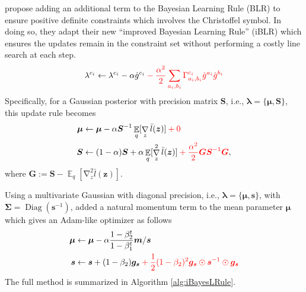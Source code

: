 \documentclass[a4paper, 11pt, oneside]{scrartcl}
\theoremstyle{break}
\DeclareMathOperator{\Diag}{Diag}
\DeclareMathOperator{\Expect}{\mathbb{E}}
\DeclareMathOperator{\grad}{\nabla}
\newcommand{\matr}[1]{\boldsymbol{#1}}
\numberwithin{equation}{section}
\begin{document}
				\parencite{LSK20} propose adding an additional term to the Bayesian Learning Rule (BLR) to ensure positive definite constraints which involves the Christoffel symbol. 
				In doing so, they adapt their new ``improved Bayesian Learning Rule'' (iBLR) which ensures the updates remain in the constraint set without performing a costly line search at each step.
				\begin{align*}
					\lambda^{c_i} \leftarrow \lambda^{c_i} - \alpha \hat{g}^{c_i} \color{red} - \frac{\alpha^2}{2} \sum_{a_i, b_i} \Gamma_{a_i, b_i}^{c_i} \hat{g}^{a_i} \hat{g}^{b_i} \color{black}
				\end{align*}
				Specifically, for a Gaussian posterior with precision matrix $\matr{S}$, i.e., $\matr{\lambda} = \{\matr{\mu}, \matr{S}\}$, this update rule becomes
				\begin{align*}
					\matr{\mu} &\leftarrow \matr{\mu} - \alpha \matr{S}^{-1} \Expect_q[\grad_z \bar{l}(\matr{z})] \color{red} + 0 \color{black}\\
					\matr{S} &\leftarrow (1 - \alpha) \matr{S} + \alpha \Expect_q[\grad_z^2 \bar{l}(\matr{z})] \color{red} + \frac{\alpha^2}{2} \matr{G} \matr{S}^{-1} \matr{G} \color{black},
				\end{align*}
				where $\matr{G} := \matr{S} - \Expect_q[\grad_z^2 \bar{l}(\matr{z})]$.

				Using a multivariate Gaussian with diagonal precision, i.e., $\matr{\lambda} = \{\matr{\mu}, \matr{s}\}$, with $\matr{\Sigma} = \Diag (\matr{s}^{-1})$, \parencite{LSK20} added a natural momentum term to the mean parameter $\matr{\mu}$ which gives an Adam-like optimizer as follows
				\begin{align*}
					\matr{\mu} &\leftarrow \matr{\mu} - \alpha \frac{1 - \beta_2^t}{1 - \beta_1^t} \matr{m} / \matr{s} \\
					\matr{s} &\leftarrow \matr{s} + (1 - \beta_2) \matr{g_s} \color{red} + \frac{1}{2} (1 - \beta_2)^2 \matr{g_s} \odot \matr{s}^{-1} \odot \matr{g_s} \color{black}
				\end{align*}
				The full method is summarized in Algorithm \ref{alg:iBayesLRule}.
\end{document}
